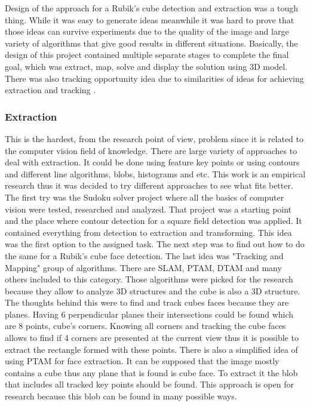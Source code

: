 \documentclass[../../main.tex]{subfiles}
\begin{document}
Design of the approach for a Rubik's cube detection and extraction was a tough thing. While it was easy to generate ideas meanwhile it was hard to prove that those ideas can survive experiments due to the quality of the image and large variety of algorithms that give good results in different situations. Basically, the design of this project contained multiple separate stages to complete the final goal, which was extract, map, solve and display the solution using 3D model. There was also tracking opportunity idea due to similarities of ideas for achieving extraction and tracking \cite{puzzle_games_solver_q4_zakharov}.

\subsubsection*{Extraction}

This is the hardest, from the research point of view, problem since it is related to the computer vision field of knowledge. There are large variety of approaches to deal with extraction. It could be done using feature key points or using contours and different line algorithms, blobs, histograms and etc. This work is an empirical research thus it was decided to try different approaches to see what fits better. The first try was the Sudoku solver project where all the basics of computer vision were tested, researched and analyzed. That project was a starting point and the place where contour detection for a square field detection was applied. It contained everything from detection to extraction and transforming. This idea was the first option to the assigned task. The next step was to find out how to do the same for a Rubik's cube face detection. The last idea was "Tracking and Mapping" group of algorithms. There are \ac{SLAM}, \ac{PTAM}, \ac{DTAM} and many others included to this category. Those algorithms were picked for the research because they allow to analyze 3D structures and the cube is also a 3D structure. The thoughts behind this were to find and track cubes faces because they are planes. Having 6 perpendicular planes their intersections could be found which are 8 points, cube's corners. Knowing all corners and tracking the cube faces allows to find if 4 corners are presented at the current view thus it is possible to extract the rectangle formed with these points.
There is also a simplified idea of using \ac{PTAM} for face extraction. It can be supposed that the image mostly contains a cube thus any plane that is found is cube face. To extract it the blob that includes all tracked key points should be found. This approach is open for research because this blob can be found in many possible ways.
\end{document}
